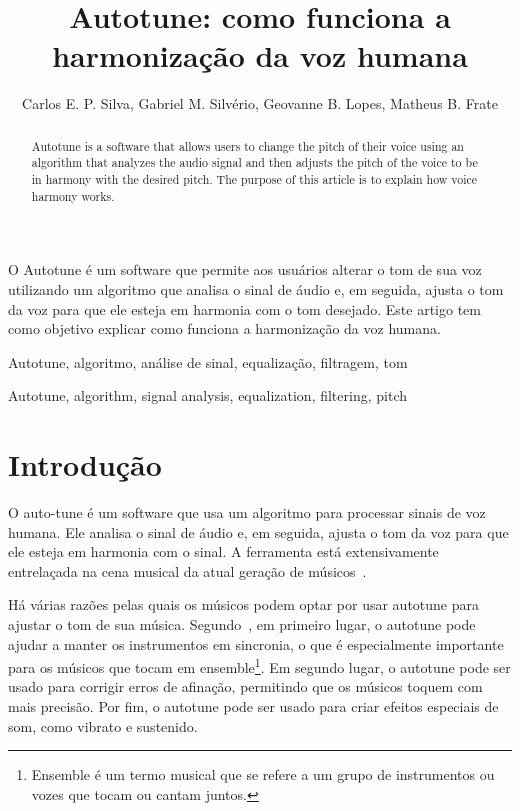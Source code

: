 \documentclass{sbrt}
\begin{document}
\title{Autotune: como funciona a harmonização da voz humana}

\author{Carlos E. P. Silva, Gabriel M. Silvério, Geovanne B. Lopes, Matheus B. Frate}

\maketitle


\begin{resumo}
  O Autotune é um software que permite aos usuários alterar o tom de sua voz utilizando um algoritmo que analisa o sinal
  de áudio e, em seguida, ajusta o tom da voz para que ele esteja em harmonia com o tom desejado. Este artigo tem como
  objetivo explicar como funciona a harmonização da voz humana.
\end{resumo}
\begin{chave}
  Autotune, algoritmo, análise de sinal, equalização, filtragem, tom \hfill \break
\end{chave}


\begin{abstract}
  Autotune is a software that allows users to change the pitch of their voice using an algorithm that analyzes the audio
  signal and then adjusts the pitch of the voice to be in harmony with the desired pitch. The purpose of this article is
  to explain how voice harmony works.
\end{abstract}
\begin{keywords}
  Autotune, algorithm, signal analysis, equalization, filtering, pitch
\end{keywords}


\section{Introdução}

O auto-tune é um software que usa um algoritmo para processar sinais de voz humana. Ele analisa o sinal de áudio e, em
seguida, ajusta o tom da voz para que ele esteja em harmonia com o sinal. A ferramenta está extensivamente entrelaçada
na cena musical da atual geração de músicos~\cite{diaz2009fate}.

Há várias razões pelas quais os músicos podem optar por usar autotune para ajustar o tom de sua música.
Segundo~\cite{browning2014auto}, em primeiro lugar, o autotune pode ajudar a manter os instrumentos em sincronia, o que
é especialmente importante para os músicos que tocam em ensemble\footnote{Ensemble é um termo musical que se refere a um
grupo de instrumentos ou vozes que tocam ou cantam juntos.}. Em segundo lugar, o autotune pode ser usado para corrigir
erros de afinação, permitindo que os músicos toquem com mais precisão. Por fim, o autotune pode ser usado para criar
efeitos especiais de som, como vibrato e sustenido.
\end{document}
